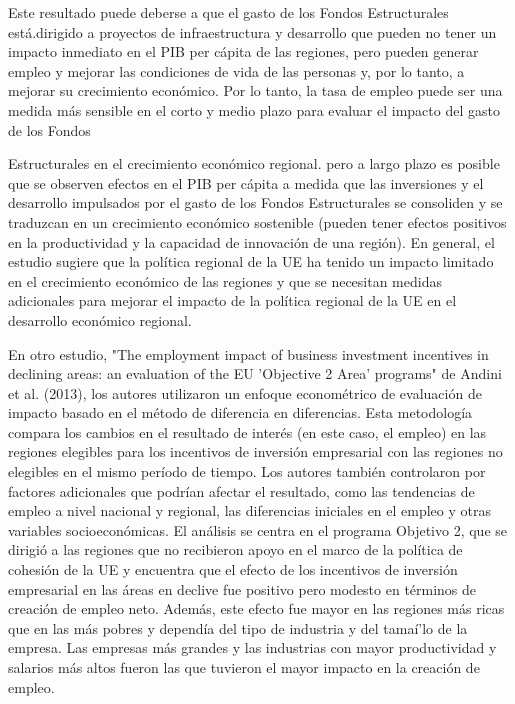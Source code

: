 \documentclass[10pt,a4paper]{article}
\begin{document}
Este resultado puede deberse a que el gasto de los Fondos Estructurales está.dirigido a proyectos de infraestructura y desarrollo que pueden no tener un impacto inmediato en el PIB per cápita de las regiones, pero pueden generar empleo y mejorar las condiciones de vida de las personas y, por lo tanto, a mejorar su crecimiento económico. Por lo tanto, la tasa de empleo puede ser una medida más sensible en el corto y medio plazo para evaluar el impacto del gasto de los Fondos

Estructurales en el crecimiento económico regional. pero a largo plazo es posible que se observen efectos en el PIB per cápita a medida que las inversiones y el desarrollo impulsados por el gasto de los Fondos Estructurales se consoliden y se traduzcan en un crecimiento económico sostenible (pueden tener efectos positivos en la productividad y la capacidad de innovación de una región). En general, el estudio sugiere que la política regional de la UE ha tenido un impacto limitado en el crecimiento económico de las regiones y que se necesitan medidas adicionales para mejorar el impacto de la política regional de la UE en el desarrollo económico regional.

En otro estudio, "The employment impact of business investment incentives in declining areas: an evaluation of the EU 'Objective 2 Area' programs" de Andini et al. (2013), los autores utilizaron un enfoque econométrico de evaluación de impacto basado en el método de diferencia en diferencias. Esta metodología compara los cambios en el resultado de interés (en este caso, el empleo) en las regiones elegibles para los incentivos de inversión empresarial con las regiones no elegibles en el mismo período de tiempo. Los autores también controlaron por factores adicionales que podrían afectar el resultado, como las tendencias de empleo a nivel nacional y regional, las diferencias iniciales en el empleo y otras variables socioeconómicas. El análisis se centra en el programa Objetivo 2, que se dirigió a las regiones que no recibieron apoyo en el marco de la política de cohesión de la UE y encuentra que el efecto de los incentivos de inversión empresarial en las áreas en declive fue positivo pero modesto en términos de creación de empleo neto. Además, este efecto fue mayor en las regiones más ricas que en las más pobres y dependía del tipo de industria y del tamaí'lo de la empresa. Las empresas más grandes y las industrias con mayor productividad y salarios más altos fueron las que tuvieron el mayor impacto en la creación de empleo.
\end{document}
